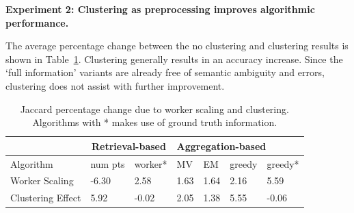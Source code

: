 \documentclass[letterpaper]{article}
\newcommand{\agp}[1]{\textcolor{magenta}{Aditya: #1}}
\newcommand{\dor}[1]{\textcolor{blue}{Doris: #1}}
\newcommand{\stitle}[1]{\noindent \textbf{#1}}
\begin{document}
\stitle{Experiment 2: Clustering as preprocessing improves algorithmic performance.}
\par \noindent The average percentage change between the no clustering and clustering results is shown in Table~\ref{statsTable}. Clustering generally results in an accuracy increase. Since the `full information' variants are already free of semantic ambiguity and errors, clustering does not assist with further improvement. %
\begin{table}[h!]
   \small
     \setlength\tabcolsep{1.5pt}
      \begin{tabular}{l|l|l|l|l|l|l}
         & \multicolumn{2}{c|}{Retrieval-based} & \multicolumn{4}{l}{Aggregation-based} \\ \hline
      Algorithm         & num pts         & worker*        & MV    & EM    & greedy  & greedy*  \\ \hline
      Worker Scaling    & -6.30           & 2.58               & 1.63  & 1.64  & 2.16    & 5.59         \\ \hline
      Clustering Effect & 5.92            & -0.02              & 2.05  & 1.38  & 5.55    & -0.06       
      \end{tabular}
      \caption{Jaccard percentage change due to worker scaling and clustering. Algorithms with * makes use of ground truth information.}
      \label{statsTable}
\end{table}


\end{document}
